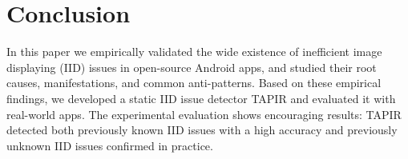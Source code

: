 \section{Conclusion}\label{sec:conclusion}

In this paper we empirically validated
the wide existence of inefficient image displaying (IID) issues in open-source Android apps,
and studied their root causes, manifestations, and common anti-patterns.
Based on these empirical findings,
we developed a static IID issue detector TAPIR and evaluated it with real-world apps. The experimental evaluation shows encouraging results: TAPIR detected both previously known IID issues with a high accuracy and previously unknown IID issues confirmed in practice.